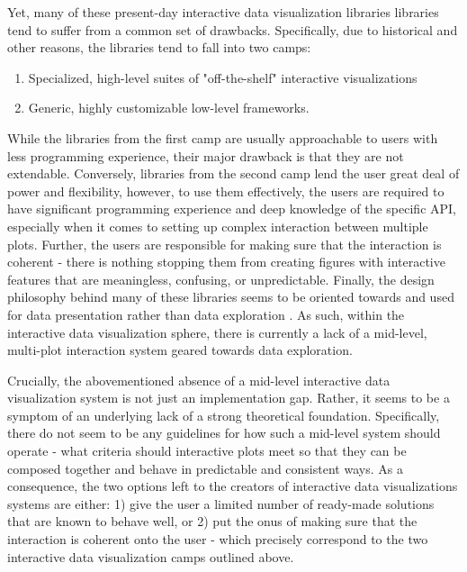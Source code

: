 \documentclass[12pt,a4paper]{article}
\begin{document}
Yet, many of these present-day interactive data visualization libraries libraries tend to suffer from a common set of drawbacks. Specifically, due to historical and other reasons, the libraries tend to fall into two camps: 

\begin{enumerate}

\item Specialized, high-level suites of "off-the-shelf" interactive visualizations
\item Generic, highly customizable low-level frameworks.

\end{enumerate}

 While the libraries from the first camp are usually approachable to users with less programming experience, their major drawback is that they are not extendable. Conversely, libraries from the second camp lend the user great deal of power and flexibility, however, to use them effectively, the users are required to have significant programming experience and deep knowledge of the specific API, especially when it comes to setting up complex interaction between multiple plots. Further, the users are responsible for making sure that the interaction is coherent - there is nothing stopping them from creating figures with interactive features that are meaningless, confusing, or unpredictable. Finally, the design philosophy behind many of these libraries seems to be oriented towards and used for data presentation rather than data exploration \citep{batch2017}. As such, within the interactive data visualization sphere, there is currently a lack of a mid-level, multi-plot interaction system geared towards data exploration.

Crucially, the abovementioned absence of a mid-level interactive data visualization system is not just an implementation gap. Rather, it seems to be a symptom of an underlying lack of a strong theoretical foundation. Specifically, there do not seem to be any guidelines for how such a mid-level system should operate - what criteria should interactive plots meet so that they can be composed together and behave in predictable and consistent ways. As a consequence, the two options left to the creators of interactive data visualizations systems are either: 1) give the user a limited number of ready-made solutions that are known to behave well, or 2) put the onus of making sure that the interaction is coherent onto the user - which precisely correspond to the two interactive data visualization camps outlined above. 
\end{document}

